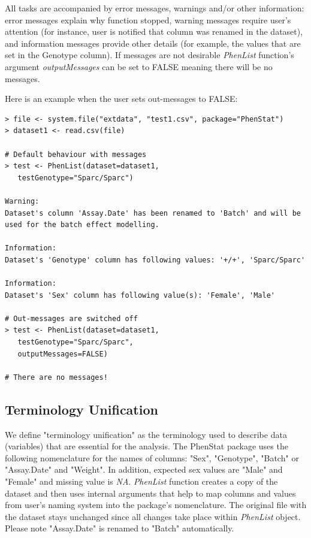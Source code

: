 \documentclass[12pt,a4paper]{article}
\begin{document}
All tasks are accompanied by error messages, warnings and/or other information: error messages explain why function stopped, 
warning messages require user's attention (for instance, user is notified that column was renamed in the dataset), and information messages provide other details (for example, the values that are set in the Genotype column). 
If messages are not desirable \textit{PhenList} function's argument \textit{outputMessages} can be set to FALSE meaning there will be no messages.

Here is an example when the user sets out-messages to FALSE: 

\begingroup
    \fontsize{8pt}{12pt}\selectfont
\begin{verbatim}
> file <- system.file("extdata", "test1.csv", package="PhenStat") 
> dataset1 <- read.csv(file)

# Default behaviour with messages
> test <- PhenList(dataset=dataset1,
   testGenotype="Sparc/Sparc")

Warning:
Dataset's column 'Assay.Date' has been renamed to 'Batch' and will be used for the batch effect modelling.

Information:
Dataset's 'Genotype' column has following values: '+/+', 'Sparc/Sparc'

Information:
Dataset's 'Sex' column has following value(s): 'Female', 'Male'

# Out-messages are switched off 
> test <- PhenList(dataset=dataset1,
   testGenotype="Sparc/Sparc",
   outputMessages=FALSE)
  
# There are no messages!
\end{verbatim}
\endgroup

\subsection{Terminology Unification}
\label{TerminilogyUnification}
We define "terminology unification" as the terminology used to describe data (variables) that are essential for the analysis. The PhenStat package uses the following nomenclature for the names of columns: "Sex", "Genotype", "Batch" or "Assay.Date" and "Weight". In addition, expected sex values are "Male" and "Female" and missing value is \textit{NA}. 
\textit{PhenList} function creates a copy of the dataset and then uses internal arguments that help to map columns and values from user's naming system into the package's nomenclature. 
The original file with the dataset stays unchanged since all changes take place within \textit{PhenList} object. Please note "Assay.Date" is renamed to "Batch" automatically.
\end{document}
